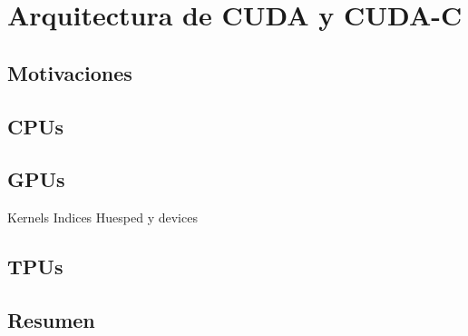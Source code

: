 \chapter{Arquitectura de CUDA y CUDA-C}\label{app:gpus}

\section{Motivaciones}

\section{CPUs}

\section{GPUs}

Kernels
Indices
Huesped y devices

\section{TPUs}

\section{Resumen}
 
